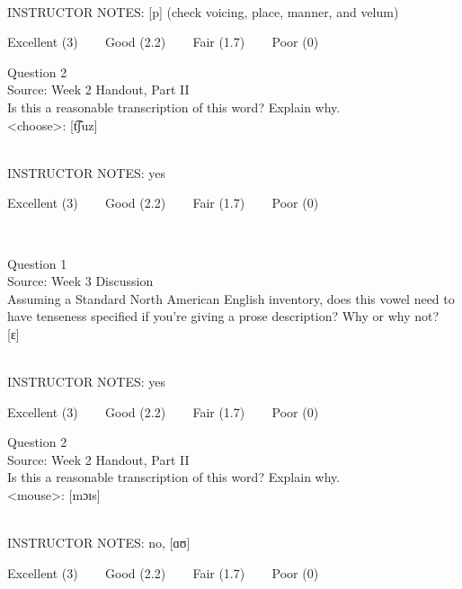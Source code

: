 \documentclass[12pt]{article}
\begin{document}
~\\
INSTRUCTOR NOTES: [p] (check voicing, place, manner, and velum)


\vfill
Excellent (3) ~~~ Good (2.2) ~~~ Fair (1.7) ~~~ Poor (0)
\newpage

{\large Question 2}\\

Source: Week 2 Handout, Part II\\

Is this a reasonable transcription of this word? Explain why.\\

<choose>: {[t͡ʃuz]}


~\\
INSTRUCTOR NOTES: yes


\vfill
Excellent (3) ~~~ Good (2.2) ~~~ Fair (1.7) ~~~ Poor (0)
\newpage

\begin{center}
\textbf{{\color{red}{\HUGE END OF EXAM}}}\\

\end{center}
\newpage

\begin{center}
\textbf{{\color{blue}{\HUGE START OF EXAM\\}}}

\textbf{{\color{blue}{\HUGE Student ID: 39945\\}}}

\textbf{{\color{blue}{\HUGE 4:50\\}}}

\end{center}
\newpage

{\large Question 1}\\

Source: Week 3 Discussion\\

Assuming a Standard North American English inventory, does this vowel need to have tenseness specified if you're giving a prose description? Why or why not?\\

{[ɛ]}


~\\
INSTRUCTOR NOTES: yes


\vfill
Excellent (3) ~~~ Good (2.2) ~~~ Fair (1.7) ~~~ Poor (0)
\newpage

{\large Question 2}\\

Source: Week 2 Handout, Part II\\

Is this a reasonable transcription of this word? Explain why.\\

<mouse>: {[mɔɪs]}


~\\
INSTRUCTOR NOTES: no, [ɑʊ]


\vfill
Excellent (3) ~~~ Good (2.2) ~~~ Fair (1.7) ~~~ Poor (0)
\newpage

\begin{center}
\textbf{{\color{red}{\HUGE END OF EXAM}}}\\

\end{center}
\newpage
\end{document}
